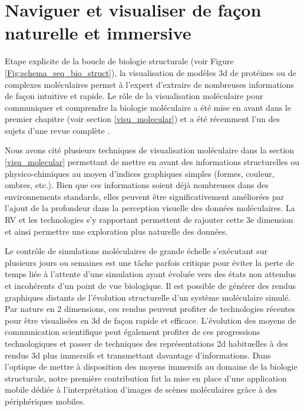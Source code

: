 
\chapter[Exploration interactive de données moléculaire en immersion]{Naviguer et visualiser de façon naturelle et immersive}
\label{Sec:CantorDigitalis}
\minitoc
\cleardoublepage

Etape explicite de la boucle de biologie structurale (voir Figure \ref{Fig:schema_seq_bio_struct}), la visualisation de modèles 3d de protéines ou de complexes moléculaires permet à l'expert d'extraire de nombreuses informations de façon intuitive et rapide. Le rôle de la visualisation moléculaire pour communiquer et comprendre la biologie moléculaire a été mise en avant dans le premier chapitre (voir section \ref{visu_molecular}) et a été récemment l'un des sujets d'une revue complète \cite{kehrer_visualization_2013}.

Nous avons cité plusieurs techniques de visualisation moléculaire dans la section \ref{visu_molecular} permettant de mettre en avant des informations structurelles ou physico-chimiques au moyen d'indices graphiques simples (formes, couleur, ombres, etc.). Bien que ces informations soient déjà nombreuses dans des environnements standards, elles peuvent être significativement améliorées par l'ajout de la profondeur dans la perception visuelle des données moléculaires. La RV et les technologies s'y rapportant permettent de rajouter cette 3e dimension et ainsi permettre une exploration plus naturelle des données.

Le contrôle de simulations moléculaires de grande échelle s’exécutant sur plusieurs jours ou semaines est une tâche parfois critique pour éviter la perte de temps liée à l'attente d'une simulation ayant évoluée vers des états non attendus et incohérents d'un point de vue biologique. Il est possible de générer des rendus graphiques distants de l'évolution structurelle d'un système moléculaire simulé. Par nature en 2 dimensions, ces rendus peuvent profiter de technologies récentes pour être visualisées en 3d de façon rapide et efficace.
L'évolution des moyens de communication scientifique peut également profiter de ces progressions technologiques et passer de techniques des représentations 2d habituelles à des rendus 3d plus immersifs et transmettant davantage d'informations. Dans l'optique de mettre à disposition des moyens immersifs au domaine de la biologie structurale, notre première contribution fut la mise en place d'une application mobile dédiée à l'interprétation d'images de scènes moléculaires grâce à des périphériques mobiles.

